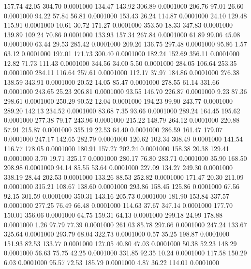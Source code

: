  157.74   42.05  304.70   0.0001000
 134.47  143.92  306.89   0.0001000
 206.76   97.01   26.60   0.0001000
  94.22   57.84   56.81   0.0001000
 153.43   26.24  114.87   0.0001000
  24.10  129.48  115.91   0.0001000
  10.61   30.72  171.27   0.0001000
 353.50   18.33  347.83   0.0001000
 139.89  109.24   70.86   0.0001000
 133.93  157.34  267.84   0.0001000
  61.89   99.06   45.08   0.0001000
  63.44   29.53  285.42   0.0001000
 209.26  136.75  297.48   0.0001000
  95.86    1.57   63.12   0.0001000
 197.01  171.73  300.40   0.0001000
 182.24  152.69  356.11   0.0001000
  12.82   71.73  111.43   0.0001000
 344.56   34.00    5.50   0.0001000
 284.05  106.64  253.35   0.0001000
 284.11  116.64  257.61   0.0001000
 112.17   37.97  184.86   0.0001000
 276.38  138.59  343.91   0.0001000
  20.52   14.05   85.47   0.0001000
 278.55   61.14  331.66   0.0001000
 243.65   25.23  206.81   0.0001000
  93.55  146.70  226.87   0.0001000
   9.23   87.36  298.61   0.0001000
 250.29   90.52   12.04   0.0001000
 194.23   99.90  243.77   0.0001000
 289.20  142.13  234.52   0.0001000
  83.68    7.35   93.66   0.0001000
 289.24  164.45  195.62   0.0001000
 277.38   79.17  243.96   0.0001000
 215.22  148.79  264.12   0.0001000
 220.88   57.91  215.87   0.0001000
 355.19   22.53   64.40   0.0001000
 286.59  161.47  179.07   0.0001000
 247.17  142.65  282.79   0.0001000
 120.62  102.34  308.49   0.0001000
 141.54  116.77  178.05   0.0001000
 180.91  157.27  202.24   0.0001000
 158.38   20.38  129.41   0.0001000
   3.70   19.71  325.17   0.0001000
 280.17   76.80  283.71   0.0001000
  35.90  168.50  208.98   0.0001000
  94.14   85.55   53.64   0.0001000
 227.09  134.27  249.30   0.0001000
 338.19   28.44  202.53   0.0001000
 133.26   88.53  252.82   0.0001000
 171.47   20.30  211.09   0.0001000
 315.21  108.67  138.60   0.0001000
 293.86  158.45  125.86   0.0001000
  67.56   92.15  301.59   0.0001000
 350.31  143.16  205.73   0.0001000
 181.90  153.84  337.57   0.0001000
 277.25   76.49   66.48   0.0001000
 114.63   37.67  347.14   0.0001000
 177.70  150.01  356.06   0.0001000
  64.75  159.31   64.13   0.0001000
 299.18   24.99  178.88   0.0001000
   1.26   97.79   77.39   0.0001000
 261.03   85.78  297.66   0.0001000
 247.24  133.67  325.64   0.0001000
 293.79   68.04  322.73   0.0001000
   0.57   35.25  198.87   0.0001000
 151.93   82.53  133.77   0.0001000
 127.05   40.80   47.03   0.0001000
  50.38   52.23  148.29   0.0001000
  56.63   75.75   42.25   0.0001000
 331.85   92.35   10.24   0.0001000
 117.58  150.29    6.03   0.0001000
  95.57   72.53  185.79   0.0001000
   4.87   36.22  114.01   0.0001000
